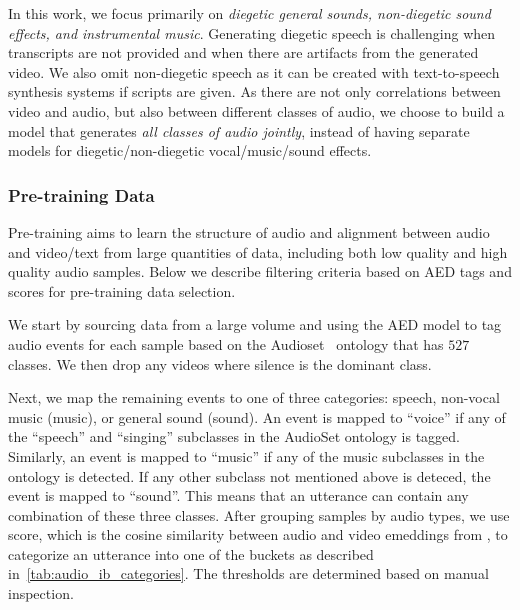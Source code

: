 In this work, we focus primarily on \textit{diegetic general sounds, non-diegetic sound effects, and instrumental music}.
Generating diegetic speech is challenging when transcripts are not provided and when there are artifacts from the generated video.
We also omit non-diegetic speech as it can be created with text-to-speech synthesis systems if scripts are given.
As there are not only correlations between video and audio, but also between different classes of audio,
we choose to build a model that generates \textit{all classes of audio jointly},
instead of having separate models for diegetic/non-diegetic vocal/music/sound effects.


\subsubsection{Pre-training Data}\label{sec:audio_pt_data}
Pre-training aims to learn the structure of audio and alignment between audio and video/text from large quantities of data,
including both low quality and high quality audio samples. Below we describe filtering criteria based on AED tags and \CAVTPShort scores for pre-training data selection.

We start by sourcing data from a large volume and using the AED model to tag audio events for each sample based on the Audioset~\citep{gemmeke2017audio} ontology that has $527$ classes.
We then drop any videos where silence is the dominant class.

Next, we map the remaining events to one of three categories: speech, non-vocal music (music), or general sound (sound).
An event is mapped to ``voice'' if any of the ``speech'' and ``singing'' subclasses in the AudioSet ontology is tagged.
Similarly, an event is mapped to ``music'' if any of the music subclasses in the ontology is detected.
If any other subclass not mentioned above is deteced, the event is mapped to ``sound''.
This means that an utterance can contain any combination of these three classes.
After grouping samples by audio types, we use \CAVTPShort score, which is the cosine similarity between audio and video emeddings from \CAVTPShort, to categorize an utterance into one of the buckets as described in~\cref{tab:audio_ib_categories}.
The thresholds are determined based on manual inspection.

